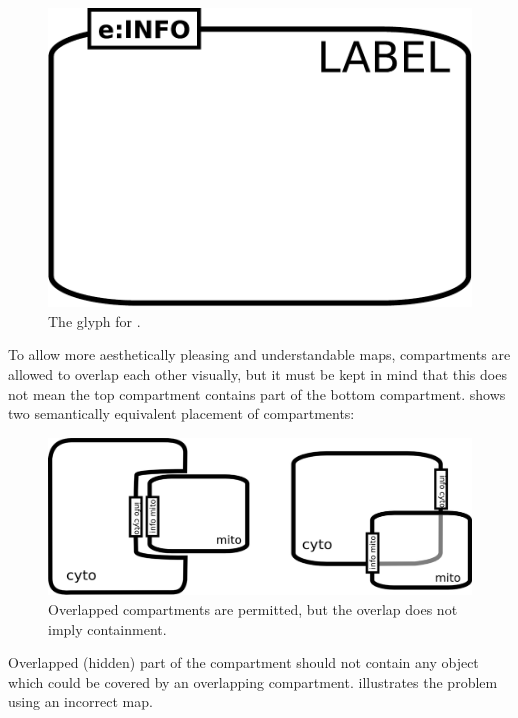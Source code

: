 \begin{figure}[H]
  \centering
  \includegraphics[scale = 0.3]{images/compartment}
  \caption{The \PD glyph for .}
  \label{fig:compartment}
\end{figure}


To allow more aesthetically pleasing and understandable maps, compartments are allowed to overlap each other visually, but it must be kept in mind that this does not mean the top compartment contains part of the bottom compartment.   shows two semantically equivalent placement of compartments:

\begin{figure}[H]
  \centering
  \includegraphics[scale = 0.4]{examples/compartment_overlapping}
  \caption{Overlapped compartments are permitted, but the overlap does not imply containment.}
  \label{fig:overlap}
\end{figure}

Overlapped (hidden) part of the compartment should not contain any object which could be covered by an overlapping compartment.   illustrates the problem using an incorrect map.

